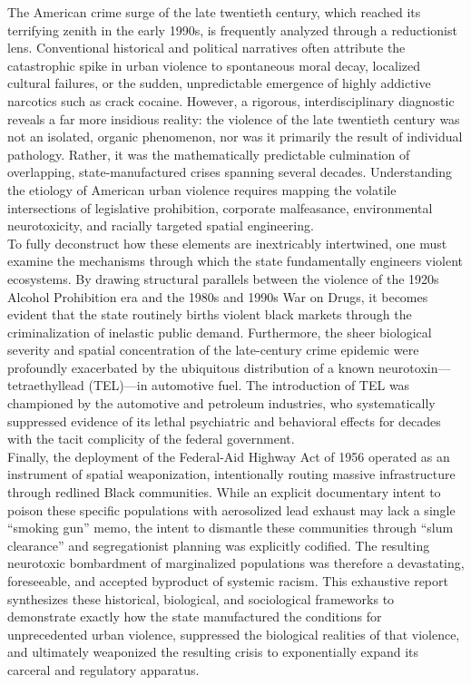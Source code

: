 \documentclass[
]{article}
\begin{document}
The American crime surge of the late twentieth century, which reached
its terrifying zenith in the early 1990s, is frequently analyzed through
a reductionist lens. Conventional historical and political narratives
often attribute the catastrophic spike in urban violence to spontaneous
moral decay, localized cultural failures, or the sudden, unpredictable
emergence of highly addictive narcotics such as crack cocaine. However,
a rigorous, interdisciplinary diagnostic reveals a far more insidious
reality: the violence of the late twentieth century was not an isolated,
organic phenomenon, nor was it primarily the result of individual
pathology. Rather, it was the mathematically predictable culmination of
overlapping, state-manufactured crises spanning several decades.
Understanding the etiology of American urban violence requires mapping
the volatile intersections of legislative prohibition, corporate
malfeasance, environmental neurotoxicity, and racially targeted spatial
engineering.\\
To fully deconstruct how these elements are inextricably intertwined,
one must examine the mechanisms through which the state fundamentally
engineers violent ecosystems. By drawing structural parallels between
the violence of the 1920s Alcohol Prohibition era and the 1980s and
1990s War on Drugs, it becomes evident that the state routinely births
violent black markets through the criminalization of inelastic public
demand. Furthermore, the sheer biological severity and spatial
concentration of the late-century crime epidemic were profoundly
exacerbated by the ubiquitous distribution of a known
neurotoxin---tetraethyllead (TEL)---in automotive fuel. The introduction
of TEL was championed by the automotive and petroleum industries, who
systematically suppressed evidence of its lethal psychiatric and
behavioral effects for decades with the tacit complicity of the federal
government.\\
Finally, the deployment of the Federal-Aid Highway Act of 1956 operated
as an instrument of spatial weaponization, intentionally routing massive
infrastructure through redlined Black communities. While an explicit
documentary intent to poison these specific populations with aerosolized
lead exhaust may lack a single ``smoking gun'' memo, the intent to
dismantle these communities through ``slum clearance'' and
segregationist planning was explicitly codified. The resulting
neurotoxic bombardment of marginalized populations was therefore a
devastating, foreseeable, and accepted byproduct of systemic racism.
This exhaustive report synthesizes these historical, biological, and
sociological frameworks to demonstrate exactly how the state
manufactured the conditions for unprecedented urban violence, suppressed
the biological realities of that violence, and ultimately weaponized the
resulting crisis to exponentially expand its carceral and regulatory
apparatus.
\end{document}
